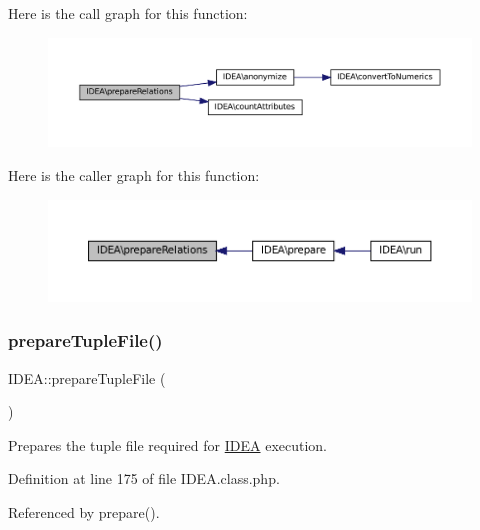 Here is the call graph for this function\+:\nopagebreak
\begin{figure}[H]
\begin{center}
\leavevmode
\includegraphics[width=350pt]{class_i_d_e_a_a7b775135905a443175ab2b6c7c4a7503_cgraph}
\end{center}
\end{figure}
Here is the caller graph for this function\+:\nopagebreak
\begin{figure}[H]
\begin{center}
\leavevmode
\includegraphics[width=350pt]{class_i_d_e_a_a7b775135905a443175ab2b6c7c4a7503_icgraph}
\end{center}
\end{figure}
\mbox{\label{class_i_d_e_a_ac163b213929ce738cb4a85a2d867a287}} 
\subsubsection{\texorpdfstring{prepare\+Tuple\+File()}{prepareTupleFile()}}
{\footnotesize\ttfamily I\+D\+E\+A\+::prepare\+Tuple\+File (\begin{DoxyParamCaption}{ }\end{DoxyParamCaption})\hspace{0.3cm}{\ttfamily [protected]}}

Prepares the tuple file required for \hyperlink{class_i_d_e_a}{I\+D\+EA} execution. 

Definition at line 175 of file I\+D\+E\+A.\+class.\+php.



Referenced by prepare().

